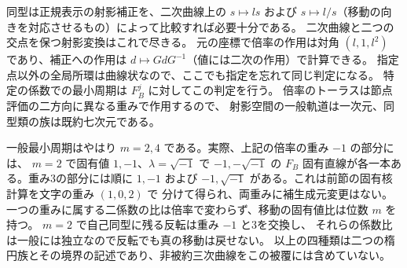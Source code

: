 同型は正規表示の射影補正を、二次曲線上の $s\mapsto l s$ および
$s\mapsto l/s$（移動の向きを対応させるもの）によって比較すれば必要十分である。
二次曲線と二つの交点を保つ射影変換はこれで尽きる。
元の座標で倍率の作用は対角 $(l,1,l^2)$ であり、補正への作用は
$d\mapsto GdG^{-1}$（値には二次の作用）で計算できる。
指定点以外の全局所環は曲線状なので、ここでも指定を忘れて同じ判定になる。
特定の係数での最小周期は $F_B^j$ に対してこの判定を行う。
倍率のトーラスは節点評価の二方向に異なる重みで作用するので、
射影空間の一般軌道は一次元、同型類の族は既約七次元である。

一般最小周期はやはり $m=2,4$ である。実際、上記の倍率の重み $-1$ の部分には、
$m=2$ で固有値 $1,-1$、$\lambda=\sqrt{-1}$ で $-1,-\sqrt{-1}$ の
$F_B$ 固有直線が各一本ある。重み3の部分には順に $1,-1$ および
$-1,\sqrt{-1}$ がある。これは前節の固有核計算を文字の重み $(1,0,2)$ で
分けて得られ、両重みに補生成元変更はない。
一つの重みに属する二係数の比は倍率で変わらず、移動の固有値比は位数 $m$ を持つ。
$m=2$ で自己同型に残る反転は重み $-1$ と3を交換し、
それらの係数比は一般には独立なので反転でも真の移動は戻せない。
以上の四種類は二つの楕円族とその境界の記述であり、非被約三次曲線をこの被覆には含めていない。
